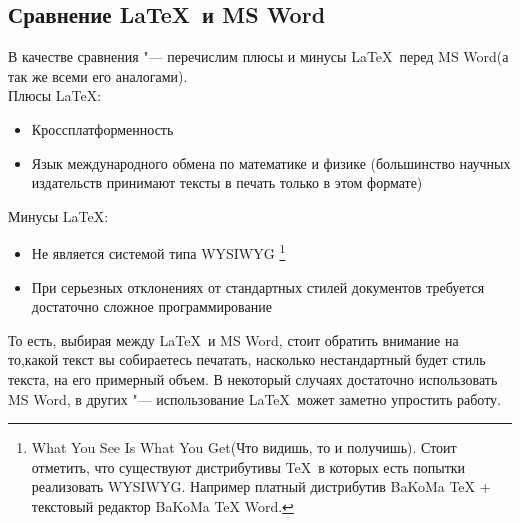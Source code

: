 \documentclass{article}
\begin{document}
		\subsection{Сравнение \LaTeX ~и MS Word}
			В качестве сравнения "--- перечислим плюсы и минусы \LaTeX ~перед MS Word(а так же всеми его аналогами). \\	
	    Плюсы \LaTeX: 
	    \begin{itemize} 
	    	\item	Кроссплатформенность 
	    	\item	Язык международного обмена по математике и физике (большинство     
   					научных издательств принимают тексты в печать  только в этом формате)
    	\end{itemize}
    	\newpage
    	Минусы \LaTeX:
		\begin{itemize} 
	    	\item	Не является системой типа WYSIWYG
	    				\footnote{What You See Is What You Get(Что видишь, то и получишь). Стоит отметить, что существуют 									дистрибутивы \TeX ~в которых есть попытки реализовать WYSIWYG. Например платный дистрибутив  BaKoMa TeX + 						текстовый редактор  BaKoMa TeX Word.}   
	    	\item	При серьезных отклонениях от стандартных стилей документов требуется
					достаточно сложное программирование	
    	\end{itemize}
    	
    		То есть, выбирая между \LaTeX ~и MS Word, стоит обратить внимание на то,какой текст вы собираетесь печатать, 					насколько нестандартный будет стиль текста, на его примерный объем. В некоторый случаях достаточно использовать MS Word,   		в других "--- использование \LaTeX ~может заметно упростить работу.
		\newpage		
\end{document}
